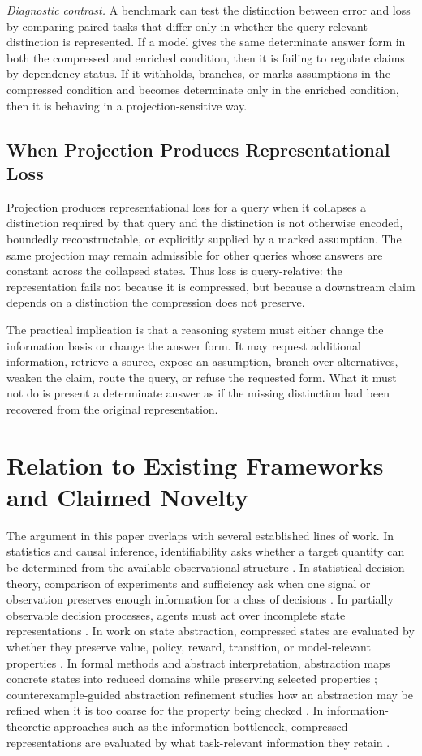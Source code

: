 \documentclass[11pt]{article}
\begin{document}
\emph{Diagnostic contrast.}
A benchmark can test the distinction between error and loss by comparing paired tasks that differ only in whether the query-relevant distinction is represented. If a model gives the same determinate answer form in both the compressed and enriched condition, then it is failing to regulate claims by dependency status. If it withholds, branches, or marks assumptions in the compressed condition and becomes determinate only in the enriched condition, then it is behaving in a projection-sensitive way.

\subsection{When Projection Produces Representational Loss}

Projection produces representational loss for a query when it collapses a distinction required by that query and the distinction is not otherwise encoded, boundedly reconstructable, or explicitly supplied by a marked assumption. The same projection may remain admissible for other queries whose answers are constant across the collapsed states. Thus loss is query-relative: the representation fails not because it is compressed, but because a downstream claim depends on a distinction the compression does not preserve.

The practical implication is that a reasoning system must either change the information basis or change the answer form. It may request additional information, retrieve a source, expose an assumption, branch over alternatives, weaken the claim, route the query, or refuse the requested form. What it must not do is present a determinate answer as if the missing distinction had been recovered from the original representation.

\section{Relation to Existing Frameworks and Claimed Novelty}

The argument in this paper overlaps with several established lines of work. In statistics and causal inference, identifiability asks whether a target quantity can be determined from the available observational structure \cite{Pearl2009}. In statistical decision theory, comparison of experiments and sufficiency ask when one signal or observation preserves enough information for a class of decisions \cite{Blackwell1953}. In partially observable decision processes, agents must act over incomplete state representations \cite{Kaelbling1998}. In work on state abstraction, compressed states are evaluated by whether they preserve value, policy, reward, transition, or model-relevant properties \cite{Li2006}. In formal methods and abstract interpretation, abstraction maps concrete states into reduced domains while preserving selected properties \cite{Cousot1977}; counterexample-guided abstraction refinement studies how an abstraction may be refined when it is too coarse for the property being checked \cite{Clarke2000}. In information-theoretic approaches such as the information bottleneck, compressed representations are evaluated by what task-relevant information they retain \cite{Tishby1999}.
\end{document}
